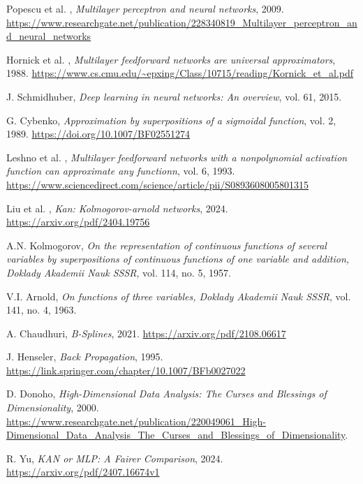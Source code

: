 \documentclass[a4paper,12pt]{report}
\begin{document}
	
	\begin{thebibliography}{99}
		Popescu et al. , \emph{Multilayer perceptron and neural networks}, 2009. \url{https://www.researchgate.net/publication/228340819_Multilayer_perceptron_and_neural_networks}
		
		Hornick et al. , \emph{Multilayer feedforward networks are universal approximators}, 1988. \url{https://www.cs.cmu.edu/~epxing/Class/10715/reading/Kornick_et_al.pdf}
		
		J. Schmidhuber, \emph{Deep learning in neural networks: An overview}, vol. 61, 2015.
		
		G. Cybenko, \emph{Approximation by superpositions of a sigmoidal function}, vol. 2, 1989. \url{https://doi.org/10.1007/BF02551274}
		
		Leshno et al. , \emph{Multilayer feedforward networks with a nonpolynomial activation function can approximate any functionn}, vol. 6, 1993. \url{https://www.sciencedirect.com/science/article/pii/S0893608005801315}
		
		Liu et al. , \emph{Kan: Kolmogorov-arnold networks}, 2024. \url{https://arxiv.org/pdf/2404.19756}
		
		A.N. Kolmogorov, \emph{On the representation of continuous functions of several variables by superpositions of continuous functions of one variable and addition, Doklady Akademii Nauk SSSR}, vol. 114, no. 5, 1957.
		
		V.I. Arnold, \emph{On functions of three variables, Doklady Akademii Nauk SSSR}, vol. 141, no. 4, 1963.
		
		A. Chaudhuri, \emph{B-Splines}, 2021. \url{https://arxiv.org/pdf/2108.06617}
		
		J. Henseler, \emph{Back Propagation}, 1995. \url{https://link.springer.com/chapter/10.1007/BFb0027022}
		
		D. Donoho, \emph{High-Dimensional Data Analysis: The Curses and Blessings of Dimensionality}, 2000. \url{https://www.researchgate.net/publication/220049061_High-Dimensional_Data_Analysis_The_Curses_and_Blessings_of_Dimensionality}.
		
		R. Yu, \emph{KAN or MLP: A Fairer Comparison}, 2024. \url{https://arxiv.org/pdf/2407.16674v1}
		

\end{thebibliography}
\end{document}

